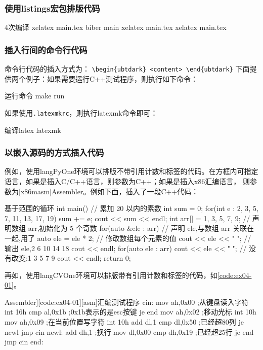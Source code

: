 \documentclass{sysucseexp}
\begin{document}
\subsubsection{使用listings宏包排版代码}
\begin{ubtdark}{4次编译}
  xelatex main.tex
  biber main
  xelatex main.tex
  xelatex main.tex
\end{ubtdark}

\subsubsection{插入行间的命令行代码}
命令行代码的插入方式为：
\verb|\begin{ubtdark} <content> \end{ubtdark}|
下面提供两个例子：如果需要运行C++测试程序，则执行如下命令：
\begin{ubtdark}{运行命令}
  make run
\end{ubtdark}

如果使用\verb|.latexmkrc|，则执行latexmk命令即可：
\begin{ubtdark}{编译latex}
  latexmk
\end{ubtdark}

\subsubsection{以嵌入源码的方式插入代码}
例如，使用langPyOne环境可以排版不带引用计数和标签的代码。在方框内可指定语言，如果是插入C/C++语言，则参数为C++；如果是插入x86汇编语言，
则参数为[x86masm]Assembler。例如下面，插入了一段C++代码：
\begin{langPyOne}[C++]{基于范围的循环}
int main(){
    // 累加 20 以内的素数
    int sum = 0;
    for(int e : {2, 3, 5, 7, 11, 13, 17, 19}){ 
        sum += e;
    }
    cout << sum << endl;
    int arr[] = {1, 3, 5, 7, 9};
    // 声明数组 arr,初始化为 5 个奇数
    for(auto &ele : arr){
        // 声明 ele,与数组 arr 关联在一起,用了 auto
        ele = ele * 2;
        // 修改数组每个元素的值
        cout << ele << " ";
        // 输出 ele,2 6 10 14 18
    }
    cout << endl;
    for(auto ele : arr){
        cout << ele << " ";
    }
    // 没有改变:1 3 5 7 9
    cout << endl;
    return 0;
}  
\end{langPyOne}

再如，使用langCVOne环境可以排版带有引用计数和标签的代码，如\autoref{code:ex04-01}。
\begin{langCVOne}[[x86masm]Assembler][code:ex04-01][asm]{汇编测试程序}
cin:
  mov ah,0x00  ;从键盘读入字符
  int 16h
  cmp al,0x1b  ;0x1b表示的是esc按键
  je end
  mov ah,0x02  ;移动光标
  int 10h
  mov ah,0x09  ;在当前位置写字符
  int 10h
  add dl,1
  cmp dl,0x50  ;已经超80列
  je newl
  jmp cin
newl: 
  add dh,1     ;换行
  mov dl,0x00
  cmp dh,0x19  ;已经超25行
  je end
  jmp cin
end:
\end{langCVOne}
\end{document}
